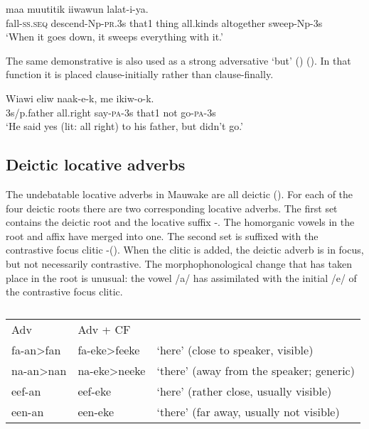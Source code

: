\ea%
\label{ex:x688}
 maa muutitik iiwawun lalat-i-ya.\\
fall-\textsc{ss}.\textsc{seq} descend-Np-\textsc{pr}.3s that1 thing all.kinds altogether sweep-Np-3s\\
\glt`When it goes down, it sweeps everything with it.'
\z

The same demonstrative is also used as a strong adversative `but' () (). In that function it is placed clause-initially rather than clause-finally.

\ea%
\label{ex:x690}
\gll Wiawi eliw naak-e-k,  me ikiw-o-k. \\
3s/p.father all.right say-\textsc{pa}-3s that1 not go-\textsc{pa}-3s\\
\glt`He said yes (lit: all right) to his father, but didn't go.'
\z

\subsection{Deictic locative adverbs} 
{}
The undebatable locative adverbs in Mauwake are all deictic (). For each of the four deictic roots there are two corresponding locative adverbs. The first set contains the deictic root and the locative suffix -. The homorganic vowels in the root and affix have merged into one. The second set is suffixed with the contrastive focus clitic -(). When the clitic is added, the deictic adverb is in focus, but not necessarily contrastive. The morphophonological change that has taken place in the root is unusual: the vowel /a/ has assimilated with the initial /e/ of the contrastive focus clitic. 

\begin{table}
\caption{}
\label{} 
\begin{tabular}{lll}
Adv &Adv + CF&\\
fa-an{\textgreater}fan &fa-eke{\textgreater}feeke &`here' (close to speaker, visible) \\
na-an{\textgreater}nan &na-eke{\textgreater}neeke &`there' (away from the speaker; generic)\\
eef-an &eef-eke &`here' (rather close, usually visible)\\
een-an &een-eke &`there' (far away, usually not visible)\\
\end{tabular}
\end{table}


